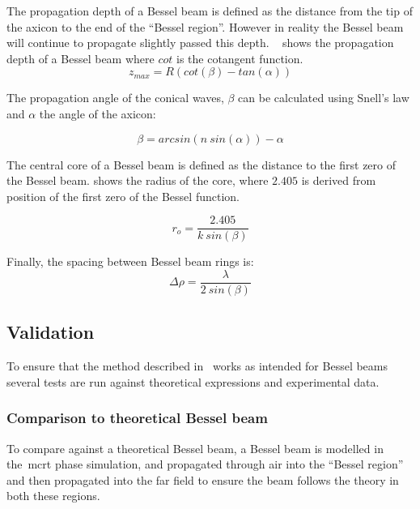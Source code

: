 The propagation depth of a Bessel beam is defined as the distance from the tip of the axicon to the end of the ``Bessel region''. However in reality the Bessel beam will continue to propagate slightly passed this depth.
~ shows the propagation depth of a Bessel beam where $cot$ is the cotangent function.
\begin{equation}
z_{max}=R\left(cot\left(\beta\right) - tan\left(\alpha\right)\right)
\label{eqn:besselzmax}
\end{equation}

The propagation angle of the conical waves, $\beta$ can be calculated using Snell's law and $\alpha$ the angle of the axicon:

\begin{equation}
\beta = arcsin\left(n\ sin\left(\alpha\right)\right)-\alpha
\label{eqn:betaangle}
\end{equation}

The central core of a Bessel beam is defined as the distance to the first zero of the Bessel beam.
 shows the radius of the core, where $2.405$ is derived from position of the first zero of the Bessel function.

\begin{equation}
r_o = \frac{2.405}{k\ sin\left(\beta\right)}
\label{eqn:coreradius}
\end{equation}

Finally, the spacing between Bessel beam rings is:
\begin{equation}
\Delta \rho = \frac{\lambda}{2\ sin\left(\beta\right)}
\end{equation}

\subsection{Validation}

To ensure that the method described in~ works as intended for Bessel beams several tests are run against theoretical expressions and experimental data.

\subsubsection*{Comparison to theoretical Bessel beam}

To compare against a theoretical Bessel beam, a Bessel beam is modelled in the~\gls*{mcrt} phase simulation, and propagated through air into the ``Bessel region'' and then propagated into the far field to ensure the beam follows the theory in both these regions.

